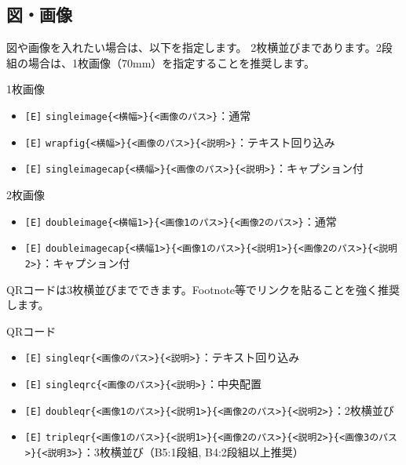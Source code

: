 \begin{multicols*}{2}
\section{図・画像}
図や画像を入れたい場合は、以下を指定します。
2枚横並びまであります。2段組の場合は、1枚画像（70mm）を指定することを推奨します。
\begin{framebox-simple}{1枚画像}
    \begin{itemize}
        \item \verb|[E]| \verb|singleimage{<横幅>}{<画像のパス>}|：通常
        \item \verb|[E]| \verb|wrapfig{<横幅>}{<画像のパス>}{<説明>}|：テキスト回り込み
        \item \verb|[E]| \verb|singleimagecap{<横幅>}{<画像のパス>}{<説明>}|：キャプション付
    \end{itemize}
\end{framebox-simple}
\begin{framebox-simple}{2枚画像}
    \begin{itemize}
        \item \verb|[E]| \verb|doubleimage{<横幅1>}{<画像1のパス>}{<画像2のパス>}|：通常
        \item \verb|[E]| \verb|doubleimagecap{<横幅1>}{<画像1のパス>}{<説明1>}{<画像2のパス>}{<説明2>}|：キャプション付
    \end{itemize}
\end{framebox-simple}
QRコードは3枚横並びまでできます。Footnote等でリンクを貼ることを強く推奨します。
\begin{framebox-simple}{QRコード}
    \begin{itemize}
        \item \verb|[E]| \verb|singleqr{<画像のパス>}{<説明>}|：テキスト回り込み
        \item \verb|[E]| \verb|singleqrc{<画像のパス>}{<説明>}|：中央配置
        \item \verb|[E]| \verb|doubleqr{<画像1のパス>}{<説明1>}{<画像2のパス>}{<説明2>}|：2枚横並び
        \item \verb|[E]| \verb|tripleqr{<画像1のパス>}{<説明1>}{<画像2のパス>}{<説明2>}{<画像3のパス>}{<説明3>}|：3枚横並び（B5:1段組, B4:2段組以上推奨）
    \end{itemize}
\end{framebox-simple}


\end{multicols*}
